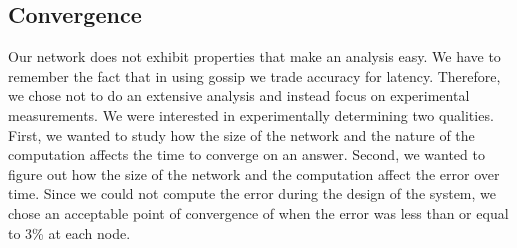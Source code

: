 \subsection{Convergence}
Our network does not exhibit properties that make an analysis easy. We have to remember the fact that in using gossip we trade accuracy for latency. Therefore, we chose not to do an extensive analysis and instead focus on experimental measurements. We were interested in experimentally determining two qualities. First, we wanted to study how the size of the network and the nature of the computation affects the time to converge on an answer. Second, we wanted to figure out how the size of the network and the computation affect the error over time. Since we could not compute the error during the design of the system, we chose an acceptable point of convergence of when the error was less than or equal to 3\% at each node. 
